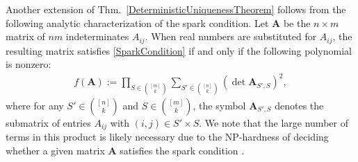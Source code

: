 \documentclass[9pt,twocolumn]{pnas-new}
\begin{document}
%


Another extension of Thm.~\ref{DeterministicUniquenessTheorem} follows from the following analytic characterization of the spark condition.  Let $\mathbf{A}$  be the $n \times m$ matrix of $nm$ indeterminates $A_{ij}$. When real numbers are substituted for $A_{ij}$, the resulting matrix satisfies \eqref{SparkCondition} if and only if the following polynomial is nonzero:
\begin{align*}
f(\mathbf{A}) := \prod_{S \in {[m] \choose k}} \sum_{S' \in {[n] \choose k}} (\det \mathbf{A}_{S',S})^2,
\end{align*}
%
where for any $S' \in {[n] \choose k}$ and $S \in {[m] \choose k}$, the symbol $\mathbf{A}_{S',S}$ denotes the submatrix of entries $A_{ij}$ with $(i,j) \in S' \times S$.   We note that the large number of terms in this product is likely necessary due to the NP-hardness of deciding whether a given matrix $\mathbf{A}$ satisfies the spark condition \cite{tillmann2014computational}.
\end{document}
